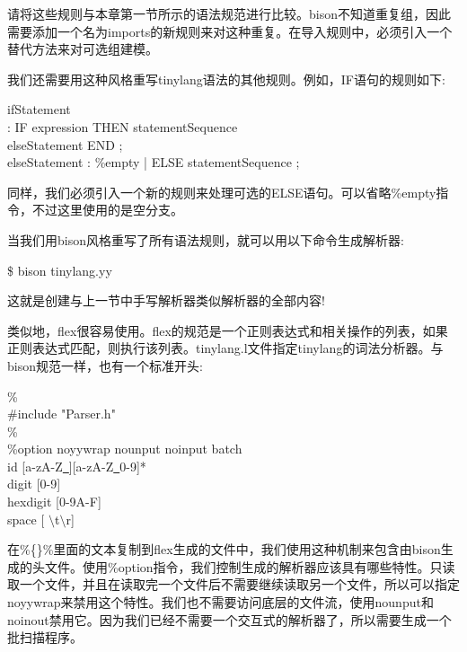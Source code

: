 请将这些规则与本章第一节所示的语法规范进行比较。bison不知道重复组，因此需要添加一个名为imports的新规则来对这种重复。在导入规则中，必须引入一个替代方法来对可选组建模。\par

我们还需要用这种风格重写tinylang语法的其他规则。例如，IF语句的规则如下:\par

\begin{tcolorbox}[colback=white,colframe=black]
ifStatement \\
\hspace*{0.5cm}: IF expression THEN statementSequence \\
\hspace*{1cm}elseStatement END ; \\
elseStatement : \%empty | ELSE statementSequence ;
\end{tcolorbox}

同样，我们必须引入一个新的规则来处理可选的ELSE语句。可以省略\%empty指令，不过这里使用的是空分支。\par

当我们用bison风格重写了所有语法规则，就可以用以下命令生成解析器:\par

\begin{tcolorbox}[colback=white,colframe=black]
\$ bison tinylang.yy
\end{tcolorbox}

这就是创建与上一节中手写解析器类似解析器的全部内容!\par

类似地，flex很容易使用。flex的规范是一个正则表达式和相关操作的列表，如果正则表达式匹配，则执行该列表。tinylang.l文件指定tinylang的词法分析器。与bison规范一样，也有一个标准开头:\par

\begin{tcolorbox}[colback=white,colframe=black]
\%{ \\
\#include "Parser.h" \\
\%} \\
\%option noyywrap nounput noinput batch \\
id [a-zA-Z\underline{~}][a-zA-Z\underline{~}0-9]* \\
digit [0-9] \\
hexdigit [0-9A-F] \\
space [ $\setminus$t$\setminus$r]
\end{tcolorbox}

在\%\{\}\%里面的文本复制到flex生成的文件中，我们使用这种机制来包含由bison生成的头文件。使用\%option指令，我们控制生成的解析器应该具有哪些特性。只读取一个文件，并且在读取完一个文件后不需要继续读取另一个文件，所以可以指定noyywrap来禁用这个特性。我们也不需要访问底层的文件流，使用nounput和noinout禁用它。因为我们已经不需要一个交互式的解析器了，所以需要生成一个批扫描程序。\par


